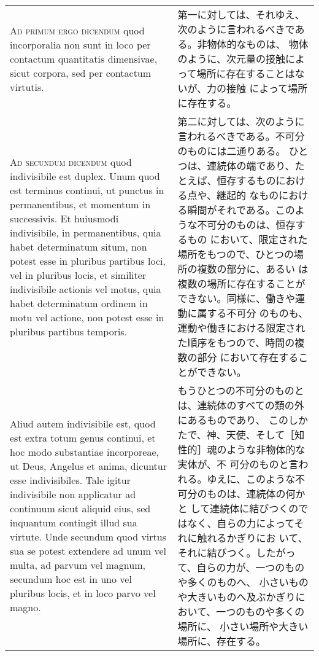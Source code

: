 \documentclass[10pt]{jsarticle} %
\begin{document}
\begin{longtable}{p{21em}p{21em}}
\\

{\scshape Ad primum ergo dicendum} quod incorporalia non sunt in loco per
 contactum quantitatis dimensivae, sicut corpora, sed per contactum
 virtutis.

&

第一に対しては、それゆえ、次のように言われるべきである。非物体的なものは、
 物体のように、次元量の接触によって場所に存在することはないが、力の接触
 によって場所に存在する。

\\

{\scshape Ad secundum dicendum} quod indivisibile est duplex. Unum quod est
 terminus continui, ut punctus in permanentibus, et momentum in
 successivis. Et huiusmodi indivisibile, in permanentibus, quia habet
 determinatum situm, non potest esse in pluribus partibus loci, vel in
 pluribus locis, et similiter indivisibile actionis vel motus, quia
 habet determinatum ordinem in motu vel actione, non potest esse in
 pluribus partibus temporis. 

&
第二に対しては、次のように言われるべきである。不可分のものには二通りある。
 ひとつは、連続体の端であり、たとえば、恒存するものにおける点や、継起的
 なものにおける瞬間がそれである。このような不可分のものは、恒存するもの
 において、限定された場所をもつので、ひとつの場所の複数の部分に、あるい
 は複数の場所に存在することができない。同様に、働きや運動に属する不可分
 のものも、運動や働きにおける限定された順序をもつので、時間の複数の部分
 において存在することができない。

\\

Aliud autem indivisibile est, quod est extra totum genus
 continui, et hoc modo substantiae incorporeae, ut Deus, Angelus et
 anima, dicuntur esse indivisibiles. Tale igitur indivisibile non
 applicatur ad continuum sicut aliquid eius, sed inquantum contingit
 illud sua virtute. Unde secundum quod virtus sua se potest extendere ad
 unum vel multa, ad parvum vel magnum, secundum hoc est in uno vel
 pluribus locis, et in loco parvo vel magno.

&

もうひとつの不可分のものとは、連続体のすべての類の外にあるものであり、
 このしかたで、神、天使、そして［知性的］魂のような非物体的な実体が、不
 可分のものと言われる。ゆえに、このような不可分のものは、連続体の何かと
 して連続体に結びつくのではなく、自らの力によってそれに触れるかぎりにお
 いて、それに結びつく。したがって、自らの力が、一つのものや多くのものへ、
 小さいものや大きいものへ及ぶかぎりにおいて、一つのものや多くの場所に、
 小さい場所や大きい場所に、存在する。


\end{longtable}
\end{document}

